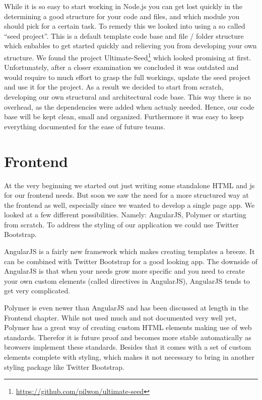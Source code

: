 While it is so easy to start working in Node.js
you can get lost quickly in the determining a good structure
for your code and files,
and which module you should pick for a certain task.
To remedy this we looked into using a so called ``seed project''.
This is a default template code base and file / folder structure which enbables
to get started quickly and relieving you from developing your own structure.
We found the project
Ultimate-Seed\footnote{\url{https://github.com/pilwon/ultimate-seed}}
which looked promising at first.
Unfortunately, after a closer examination we concluded it was outdated
and would require to much effort to grasp the full workings,
update the seed project and use it for the \gls{project}.
As a result we decided to start from scratch,
developing our own structural and architectural code base.
This way there is no overhead, as the dependencies were added when actualy 
needed. Hence, our code base will be kept clean, small and organized.
Furthermore it was easy to keep everything documented for the ease of future 
teams.

\section{Frontend}
At the very beginning we started out
just writing some standalone HTML and \gls{js} for our frontend needs.
But soon we saw the need for a more structured way at the frontend as well,
especially since we wanted to develop a single page app.
We looked at a few different possibilities.
Namely: AngularJS, Polymer or starting from scratch.
To address the styling of our application we could use Twitter Bootstrap.

AngularJS is a fairly new framework which makes creating templates a breeze.
It can be combined with Twitter Bootstrap for a good looking app.
The downside of AngularJS is that when your needs grow more specific
and you need to create your own custom elements
(called directives in AngularJS),
AngularJS tends to get very complicated.

Polymer is even newer than AngularJS
and has been discussed at length in the Frontend chapter.
While not used much and not documented very well yet,
Polymer has a great way of creating custom HTML elements
making use of web standards.
Therefor it is future proof
and becomes more stable automatically as browsers implement these standards.
Besides that it comes with a set of custom elements
complete with styling,
which makes it not necessary to bring in another styling package
like Twitter Bootstrap.

